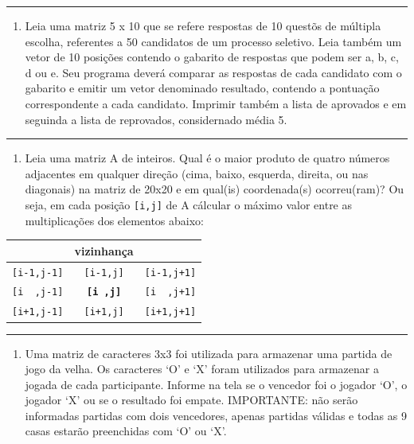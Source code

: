 \documentclass[12pt,a4paper]{article}
\providecommand{\tightlist}{%
      \setlength{\itemsep}{0pt}\setlength{\parskip}{0pt}}
\begin{document}
    \begin{center}\rule{0.5\linewidth}{0.5pt}\end{center}

\begin{enumerate}
\def\labelenumi{\arabic{enumi}.}
\setcounter{enumi}{4}
\tightlist
\item
  Leia uma matriz 5 x 10 que se refere respostas de 10 questõs de
  múltipla escolha, referentes a 50 candidatos de um processo seletivo.
  Leia também um vetor de 10 posições contendo o gabarito de respostas
  que podem ser a, b, c, d ou e. Seu programa deverá comparar as
  respostas de cada candidato com o gabarito e emitir um vetor
  denominado resultado, contendo a pontuação correspondente a cada
  candidato. Imprimir também a lista de aprovados e em seguinda a lista
  de reprovados, considernado média 5.
\end{enumerate}

    \begin{center}\rule{0.5\linewidth}{0.5pt}\end{center}

\begin{enumerate}
\def\labelenumi{\arabic{enumi}.}
\setcounter{enumi}{5}
\tightlist
\item
  Leia uma matriz A de inteiros. Qual é o maior produto de quatro
  números adjacentes em qualquer direção (cima, baixo, esquerda,
  direita, ou nas diagonais) na matriz de 20x20 e em qual(is)
  coordenada(s) ocorreu(ram)? Ou seja, em cada posição
  \texttt{{[}i,j{]}} de A cálcular o máximo valor entre as
  multiplicações dos elementos abaixo:
\end{enumerate}

\begin{longtable}[]{@{}ccc@{}}
\toprule()
& vizinhança & \\
\midrule()
\endhead
\texttt{{[}i-1,j-1{]}} & \texttt{{[}i-1,j{]}} &
\texttt{{[}i-1,j+1{]}} \\
\texttt{{[}i\ \ ,j-1{]}} & \textbf{\texttt{{[}i\ ,j{]}}} &
\texttt{{[}i\ \ ,j+1{]}} \\
\texttt{{[}i+1,j-1{]}} & \texttt{{[}i+1,j{]}} &
\texttt{{[}i+1,j+1{]}} \\
\bottomrule()
\end{longtable}

    \begin{center}\rule{0.5\linewidth}{0.5pt}\end{center}

\begin{enumerate}
\def\labelenumi{\arabic{enumi}.}
\setcounter{enumi}{6}
\tightlist
\item
  Uma matriz de caracteres 3x3 foi utilizada para armazenar uma partida
  de jogo da velha. Os caracteres `O' e `X' foram utilizados para
  armazenar a jogada de cada participante. Informe na tela se o vencedor
  foi o jogador `O', o jogador `X' ou se o resultado foi empate.
  IMPORTANTE: não serão informadas partidas com dois vencedores, apenas
  partidas válidas e todas as 9 casas estarão preenchidas com `O' ou
  `X'.
\end{enumerate}
\end{document}
